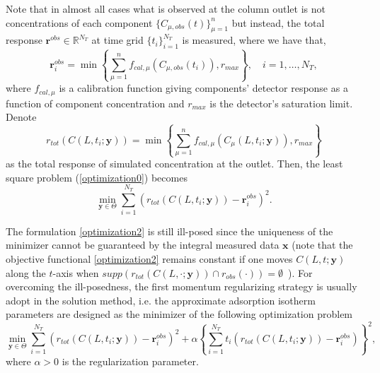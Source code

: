 \documentclass[thmsa,onecolumn,12pt]{article}%
\begin{document}
Note that in almost all cases what is observed at the column outlet is not concentrations of each component $\{C_{\mu,obs}(t)\}^n_{\mu=1}$ but instead, the total response $\mathbf{r}^{obs}\in \mathbb{R}^{N_T}$ at time grid $\{t_i\}^{N_T}_{i=1}$ is measured, where we have that,
\begin{equation*}
\mathbf{r}^{obs}_i = \min \left\{ \sum^n_{\mu=1} f_{cal,\mu} (C_{\mu,obs}(t_i)) , r_{max} \right\}, \quad i=1, \dots, N_T,
\end{equation*}
where $f_{cal,\mu}$ is a calibration function giving components' detector response as a function of component concentration and $r_{max}$ is the detector's saturation limit. Denote
\begin{equation}
r_{tot} (C(L,t_i;\mathbf{y})) = \min \left\{ \sum^n_{\mu=1} f_{cal,\mu} (C_{\mu}(L,t_i;\mathbf{y})) , r_{max} \right\}
\label{TotalResponse}
\end{equation}
as the total response of simulated concentration at the outlet. Then, the least square problem (\ref{optimization0}) becomes
\begin{equation}\label{optimization2}
\min_{\mathbf{y}\in \Theta} \sum^{N_T}_{i=1} \left( r_{tot}(C(L,t_i;\mathbf{y}) )- \mathbf{r}^{obs}_i \right)^2.
\end{equation}

The formulation \eqref{optimization2} is still ill-posed since the uniqueness of the minimizer
cannot be guaranteed by the integral measured data  $\mathbf{x}$ (note that the objective functional \eqref{optimization2} remains constant if one moves $C(L,t;\mathbf{y})$ along the $t$-axis when $supp(r_{tot}(C(L,\cdot;\mathbf{y}))\cap r_{obs}(\cdot)) = \emptyset$~\cite{James-94}). For overcoming the ill-posedness, the first momentum regularizing strategy is usually adopt in the solution method, i.e. the approximate adsorption isotherm parameters are designed as the minimizer of the following optimization problem
\begin{equation}\label{optimization3}
\min_{\mathbf{y}\in \Theta} \sum^{N_T}_{i=1} \left( r_{tot}(C(L,t_i;\mathbf{y}) )- \mathbf{r}^{obs}_i \right)^2 + \alpha  \left\{ \sum^{N_T}_{i=1} t_i\left( r_{tot}(C(L,t_i;\mathbf{y}) )- \mathbf{r}^{obs}_i \right) \right\}^2,
\end{equation}
where $\alpha>0$ is the regularization parameter.
\end{document}
